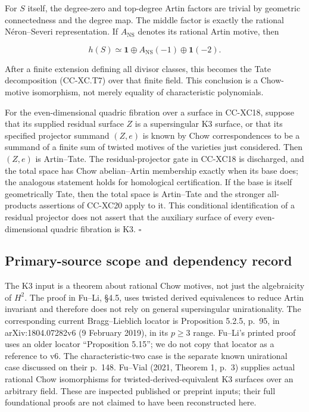 For \(S\) itself, the degree-zero and top-degree Artin factors are
trivial by geometric connectedness and the degree map. The middle factor
is exactly the rational Néron--Severi representation. If
\(A_{\mathrm{NS}}\) denotes its rational Artin motive, then

\[
                h(S)\simeq
                  \mathbf1\oplus A_{\mathrm{NS}}(-1)
                              \oplus\mathbf1(-2).
\tag{CC-XC.T9}
\]

After a finite extension defining all divisor classes, this becomes the
Tate decomposition (CC-XC.T7) over that finite field. This conclusion is
a Chow-motive isomorphism, not merely equality of characteristic
polynomials.

For the even-dimensional quadric fibration over a surface in CC-XC18,
suppose that its supplied residual surface \(Z\) is a supersingular K3
surface, or that its specified projector summand \((Z,e)\) is known by
Chow correspondences to be a summand of a finite sum of twisted motives
of the varieties just considered. Then \((Z,e)\) is Artin--Tate. The
residual-projector gate in CC-XC18 is discharged, and the total space
has Chow abelian--Artin membership exactly when its base does; the
analogous statement holds for homological certification. If the base is
itself geometrically Tate, then the total space is Artin--Tate and the
stronger all-products assertions of CC-XC20 apply to it. This
conditional identification of a residual projector does not assert that
the auxiliary surface of every even-dimensional quadric fibration is K3.
\(\square\)

\subsection{Primary-source scope and dependency
record}\label{primary-source-scope-and-dependency-record}

The K3 input is a theorem about rational Chow motives, not just the
algebraicity of \(H^2\). The proof in Fu--Li, §4.5, uses twisted derived
equivalences to reduce Artin invariant and therefore does not rely on
general supersingular unirationality. The corresponding current
Bragg--Lieblich locator is Proposition 5.2.5, p.~95, in
arXiv:1804.07282v6 (9 February 2019), in its \(p\ge3\) range. Fu--Li's
printed proof uses an older locator ``Proposition 5.15''; we do not copy
that locator as a reference to v6. The characteristic-two case is the
separate known unirational case discussed on their p.~148. Fu--Vial
(2021, Theorem 1, p.~3) supplies actual rational Chow isomorphisms for
twisted-derived-equivalent K3 surfaces over an arbitrary field. These
are inspected published or preprint inputs; their full foundational
proofs are not claimed to have been reconstructed here.

